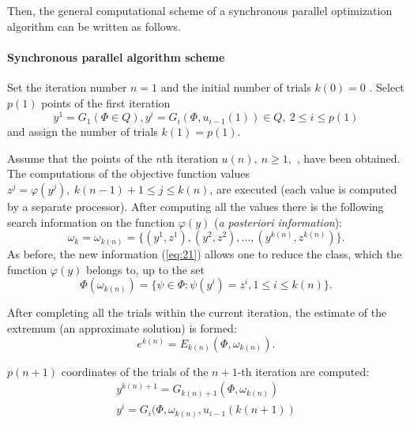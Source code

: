 Then, the general computational scheme of a synchronous parallel optimization algorithm can be written as follows.

\paragraph{\textbf{Synchronous parallel algorithm scheme}}
\begin{description}
\item[\textbf{Step 1}]{Set the iteration number $n=1$  and the initial number of trials $k(0)=0$ . Select $p(1)$ points of the first iteration  
\begin{equation}
\label{eq:20}
y^1=G_1(\Phi\in Q),y^i=G_i(\Phi,u_{i-1}(1))\in Q,\ 2\leq i\leq p(1)
\end{equation}
and assign the number of trials $k(1)=p(1)$.}
\item[\textbf{Step 2}]{Assume that the points of the $n$th iteration $u(n),\ n\geq 1,$ , have been obtained. The computations of the objective function values $z^j=\varphi(y^j),\ k(n-1)+1\leq j\leq k(n)$, are executed (each value is computed by a separate processor). After computing all the values there is the following search information on the function $\varphi(y)$ (\textit{a posteriori information}):
\begin{equation}
\label{eq:21}
\omega_k=\omega_{k(n)}=\{(y^1,z^1),(y^2,z^2),\ldots ,(y^{k(n)},z^{k(n)})\}.
\end{equation}
As before, the new information (\ref{eq:21}) allows one to reduce the class, which the function $\varphi(y)$ belongs to, up to the set   
\begin{equation}
\label{eq:22}
\Phi(\omega_{k(n)})=\{\psi\in\Phi:\psi(y^i)=z^i,1\leq i \leq k(n)\}.
\end{equation}
}
\item[\textbf{Step 3}]{After completing all the trials within the current iteration, the estimate of the extremum (an approximate solution) is formed:  
\begin{equation}
\label{eq:23}
e^{k(n)}=E_{k(n)}(\Phi,\omega_{k(n)}).
\end{equation}
}
\item[\textbf{Step 4}]{$p(n+1)$   coordinates of the trials of the $n+1$-th iteration are computed:
\begin{equation}
\label{eq:24}
\begin{gathered}
y^{k(n)+1}=G_{k(n)+1}(\Phi,\omega_{k(n)}) \\
y^i=G_i(\Phi,\omega_{k(n)},u_{i-1}(k(n+1))

\end{gathered}
\end{equation}}
\end{description}
